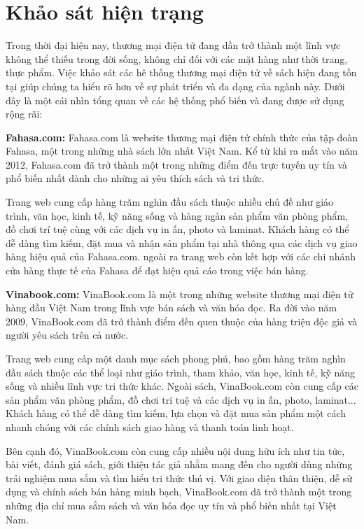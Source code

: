 \documentclass[../DoAn.tex]{subfiles}
\begin{document}


\section{Khảo sát hiện trạng}
\label{section:2.1}
Trong thời đại hiện nay, thương mại điện tử đang dần trở thành một lĩnh vực không thể thiếu trong đời sống, không chỉ đối với các mặt hàng như thời trang, thực phẩm. Việc khảo sát các hê thống thương mại điện tử về sách hiện đang tồn tại giúp chúng ta hiểu rõ hơn về sự phát triển và đa dạng của ngành này. Dưới đây là một cái nhìn tổng quan về các hệ thống phổ biến và đang được sử dụng rộng rãi:

\textbf{Fahasa.com:} Fahasa.com là website thương mại điện tử chính thức của tập đoàn Fahasa, một trong những nhà sách lớn nhất Việt Nam. Kể từ khi ra mắt vào năm 2012, Fahasa.com đã trở thành một trong những điểm đến trực tuyến uy tín và phổ biến nhất dành cho những ai yêu thích sách và tri thức.

Trang web cung cấp hàng trăm nghìn đầu sách thuộc nhiều chủ đề như giáo trình, văn học, kinh tế, kỹ năng sống và hàng ngàn sản phẩm văn phòng phẩm, đồ chơi trí tuệ cùng với các dịch vụ in ấn, photo và laminat. Khách hàng có thể dễ dàng tìm kiếm, đặt mua và nhận sản phẩm tại nhà thông qua các dịch vụ giao hàng hiệu quả của Fahasa.com. ngoài ra trang web còn kết hợp với các chi nhánh cửa hàng thực tế của Fahasa để đạt hiệu quả cáo trong việc bán hàng. 

\textbf{Vinabook.com:} VinaBook.com là một trong những website thương mại điện tử hàng đầu Việt Nam trong lĩnh vực bán sách và văn hóa đọc. Ra đời vào năm 2009, VinaBook.com đã trở thành điểm đến quen thuộc của hàng triệu độc giả và người yêu sách trên cả nước.

Trang web cung cấp một danh mục sách phong phú, bao gồm hàng trăm nghìn đầu sách thuộc các thể loại như giáo trình, tham khảo, văn học, kinh tế, kỹ năng sống và nhiều lĩnh vực tri thức khác. Ngoài sách, VinaBook.com còn cung cấp các sản phẩm văn phòng phẩm, đồ chơi trí tuệ và các dịch vụ in ấn, photo, laminat... Khách hàng có thể dễ dàng tìm kiếm, lựa chọn và đặt mua sản phẩm một cách nhanh chóng với các chính sách giao hàng và thanh toán linh hoạt.

Bên cạnh đó, VinaBook.com còn cung cấp nhiều nội dung hữu ích như tin tức, bài viết, đánh giá sách, giới thiệu tác giả nhằm mang đến cho người dùng những trải nghiệm mua sắm và tìm hiểu tri thức thú vị. Với giao diện thân thiện, dễ sử dụng và chính sách bán hàng minh bạch, VinaBook.com đã trở thành một trong những địa chỉ mua sắm sách và văn hóa đọc uy tín và phổ biến nhất tại Việt Nam.
\end{document}
